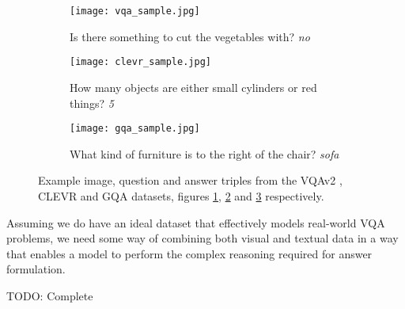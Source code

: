 \begin{figure}
  \begin{subfigure}[t]{0.3\textwidth}
    \centering
    \texttt{[image: vqa\_sample.jpg]} 
    \caption{Is there something to cut the vegetables with? \textit{no}}
    \label{fig:vqa_sample}
  \end{subfigure}
  \hfill
  \begin{subfigure}[t]{0.3\textwidth}
    \centering
    \texttt{[image: clevr\_sample.jpg]} 
    \caption{How many objects are either small cylinders or red things? \textit{5}}
    \label{fig:clevr_sample}
  \end{subfigure}
  \hfill
  \begin{subfigure}[t]{0.3\textwidth}
    \centering
    \texttt{[image: gqa\_sample.jpg]} 
    \caption{What kind of furniture is to the right of the chair? \textit{sofa}}
    \label{fig:gqa_sample}
  \end{subfigure}
  \caption[Example instances from the VQAv2, CLEVR and GQA datasets.]{Example image, question and answer triples from the VQAv2 \cite{goyal2017making}, CLEVR \cite{johnson2017clevr} and GQA \cite{hudson2019gqa} datasets, figures \ref{fig:vqa_sample}, \ref{fig:clevr_sample} and \ref{fig:gqa_sample} respectively.}
  \label{fig:dataset_samples}
\end{figure}

Assuming we do have an ideal dataset that effectively models real-world VQA problems, we need some way of combining both visual and textual data in a way that enables a model to perform the complex reasoning required for answer formulation.

{\color{red} TODO: Complete}






